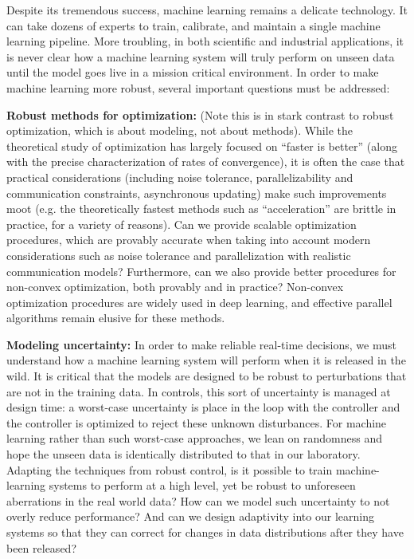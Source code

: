 Despite its tremendous success, machine learning remains a delicate technology. It can take dozens of experts to train, calibrate, and maintain a single machine learning pipeline. More troubling, in both scientific and industrial applications, it is never clear how a machine learning system will truly perform on unseen data until the model goes live in a mission critical environment. In order to make machine learning more robust, several important questions must be addressed:

{\bf Robust methods for optimization:}  (Note this is in stark contrast to robust optimization, which is about modeling, not about methods).    While the theoretical study of optimization has largely focused on ``faster is better'' (along with the precise characterization of rates of convergence), it is often the case that practical considerations (including noise tolerance, parallelizability and communication constraints, asynchronous updating) make such improvements moot (e.g. the theoretically fastest methods such as ``acceleration'' are brittle in practice, for a variety of reasons). Can we provide scalable optimization procedures, which are provably accurate when taking into account modern considerations such as noise tolerance and parallelization with realistic communication models? Furthermore, can we also provide better procedures for non-convex optimization, both provably and in practice? Non-convex optimization procedures are widely used in deep learning, and effective parallel algorithms remain elusive for these methods.

{\bf Modeling uncertainty:} In order to make reliable real-time decisions, we must understand how a machine learning system will perform when it is released in the wild.  It is critical that the models are designed to be robust to perturbations that are not in the training data.  In controls, this sort of uncertainty is managed at design time: a worst-case uncertainty is place in the loop with the controller and the controller is optimized to reject these unknown disturbances.  For machine learning rather than such worst-case approaches, we lean on randomness and hope the unseen data is identically distributed to that in our laboratory.  Adapting the techniques from robust control, is it possible to train machine-learning systems to perform at a high level, yet be robust to unforeseen aberrations in the real world data?  How can we model such uncertainty to not overly reduce performance?  And can we design adaptivity into our learning systems so that they can correct for changes in data distributions after they have been released?

